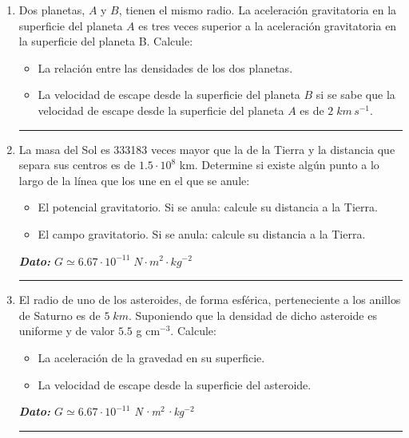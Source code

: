 \documentclass[a4paper,14pt]{extarticle}
\title{\textbf{	}}
\date{}
\newcommand{\halmos}{
\vspace*{-2ex}

\begin{flushright}
\rule{1mm}{2.5mm} \end{flushright}
\vspace*{-3ex}

}
\renewcommand{\qed}{\halmos}
\begin{document}



\begin{enumerate}
  \setlength\itemsep{1.5em}
  
   \item 	 Dos planetas, $A$ y $B$, tienen el mismo radio. La aceleración gravitatoria en la 
				superficie del planeta $A$ es tres veces superior a la aceleración gravitatoria en 					la superficie del  planeta B. Calcule: 
					\begin{itemize}
						\item[a)]  La relación entre las densidades de los dos planetas.
						\item[b)] La velocidad de escape desde la superficie del planeta $B$ si se 								sabe que la velocidad de escape desde la superficie del planeta $A$ es de $2\;km\,s^{-1}$.
					\end{itemize}
	\qed
	
	
	\item 	La masa del Sol es 333183 veces mayor que la de la Tierra y la distancia que
separa sus centros es de $1.5\cdot 10^8$ km. Determine si existe algún punto a lo largo de la línea que los une en el que se anule:
				\begin{itemize}
					\item[a)] El potencial gravitatorio. Si se anula: calcule su distancia a 									la Tierra.
					\item[b)] El campo gravitatorio. Si se anula: calcule su distancia a la 									Tierra.
				\end{itemize}
				\textit{\small \textbf{Dato:} $G\simeq 6.67\cdot 10^{-11}\;N·m^2·kg^{-2}$}

				\qed
		
   
		\item   El radio de uno de los asteroides, de forma esférica, perteneciente a los anillos de
Saturno es de $5\;km$. Suponiendo que la densidad de dicho asteroide es uniforme y de valor $5.5$ g
cm$^{-3}$. Calcule:
			\begin{itemize}
				\item[a)] La aceleración de la gravedad en su superficie.
				\item[b)] La velocidad de escape desde la superficie del asteroide.
			\end{itemize}
			\textit{\small \textbf{Dato:} $G\simeq 6.67\cdot 10^{-11}$ N·m$^2$·kg$^{-2}$}
			\qed
			

\end{enumerate}
\end{document}
